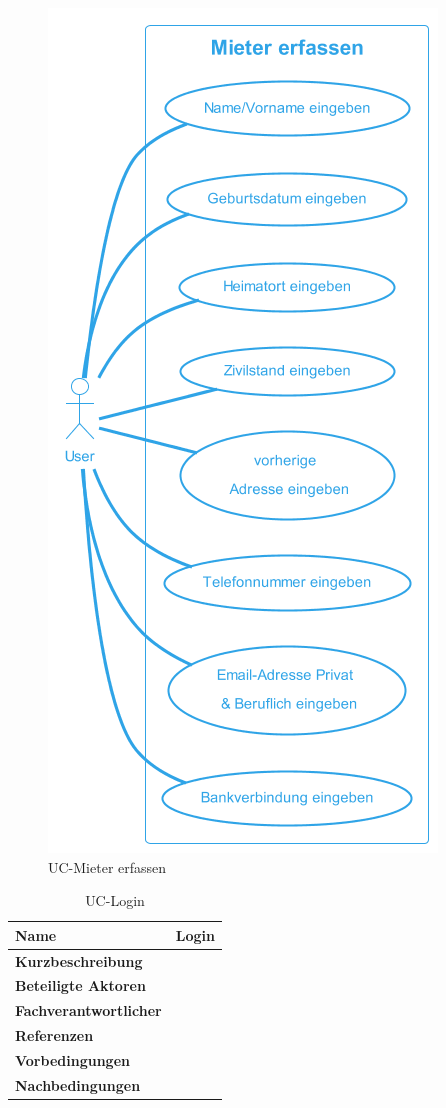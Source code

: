 \begin{figure}[H]
  \begin{center}
    \includegraphics[width=0.4\linewidth]{content/diagrams/out/usecase/mieterErfassen/Mieter erfassen.png}
    \caption{UC-Mieter erfassen}
  \end{center}
  \label{mieterErfassen}
\end{figure}

\begin{table}[H]
  \centering
  \settowidth{}
  \setlength\extrarowheight{2pt}
  \begin{tabulary}{1.0\textwidth}{|a|m{12cm}|}
    \hline
    \textbf{Name}& Login\\
    \hline 
    \textbf{Kurzbeschreibung} & \\
    \hline
    \textbf{Beteiligte Aktoren} & \\
    \hline
    \textbf{Fachverantwortlicher} & \\
    \hline
    \textbf{Referenzen} & \\
    \hline
    \textbf{Vorbedingungen} & \\
    \hline
    \textbf{Nachbedingungen} & \\
    \hline
  \end{tabulary}
  \caption{UC-Login}
\end{table}